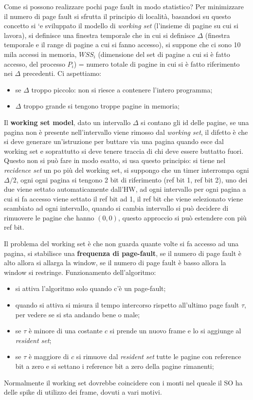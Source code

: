 \documentclass[12pt]{article}
\begin{document}
Come si possono realizzare pochi page fault in modo statistico? Per minimizzare il numero di page fault si sfrutta il principio di localit\`a, basandosi su questo concetto si 
`e sviluppato il modello di \emph{working set} (l'insieme di pagine su cui si lavora), si definisce una finestra temporale che in cui si definisce $\Delta$ (finestra temporale e il range di pagine a cui si fanno accesso), si suppone che ci sono 10 mila accessi in memoria, $WSS_i$ (dimensione del set di pagine a cui si \`e fatto accesso, del processo $P_i$) = numero totale di pagine in cui si \`e fatto riferimento nei $\Delta$ precedenti. Ci aspettiamo:
\begin{itemize}
  \item se $\Delta$ troppo piccolo: non si riesce a contenere l'intero programma;
  \item $\Delta$ troppo grande si tengono troppe pagine in memoria;
\end{itemize}
Il \textbf{working set model}, dato un intervallo $\Delta$ si contano gli id delle pagine, se una pagina non \`e presente nell'intervallo viene rimosso dal \emph{working set}, il difetto \`e che si deve generare un'istruzione per buttare via una pagina quando esce dal working set e soprattutto si deve tenere traccia di chi deve essere buttatto fuori. Questo non si pu\`o fare in modo esatto, si usa questo principio: si tiene nel \emph{recidence set} un po pi\`u del working set, si suppongo che un timer interrompa ogni $\Delta/2$, ogni ogni pagina si tengono 2 bit di riferimento (ref bit 1, ref bit 2), uno dei due viene settato automaticamente dall'HW, ad ogni intervallo per ogni pagina a cui si fa accesso viene settato il ref bit ad 1, il ref bit che viene selezionato viene scambiato ad ogni intervallo,  quando si cambia intervallo si pu\`o decidere di rimuovere le pagine che hanno $(0, 0)$, questo approccio si pu\`o estendere con pi\`u ref bit.

Il problema del working set \`e che non guarda quante volte si fa accesso ad una pagina, si stabilisce una \textbf{frequenza di page-fault}, se il numero di page fault \`e alto allora si allarga la window, se il numero di page fault \`e basso  allora la window si restringe. Funzionamento dell'algoritmo:
\begin{itemize}
  \item si attiva l'algoritmo solo quando c'\`e un page-fault;
  \item quando si attiva si misura il tempo intercorso rispetto all'ultimo page fault $\tau$, per vedere se si sta andando bene o male;
  \item se $\tau$ \`e minore di una costante $c$ si prende un nuovo frame e lo si aggiunge al \emph{resident set};
  \item se $\tau$ \`e maggiore di $c$  si rimuove dal \emph{resident set} tutte le pagine con reference bit a zero e si settano i reference bit a zero della pagine rimanenti;
\end{itemize}
Normalmente il working set dovrebbe coincidere con i monti nel queale il SO ha delle spike di utilizzo dei frame, dovuti a vari motivi.
\end{document}
